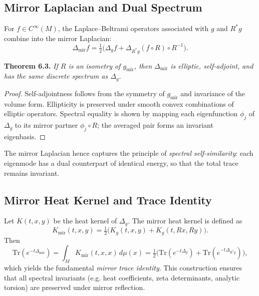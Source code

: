 \subsection{Mirror Laplacian and Dual Spectrum}\relax \hspace{0pt}

For \(f\in C^{\infty}(M)\),
the Laplace–Beltrami operators associated with \(g\) and \(R^{*}g\)
combine into the mirror Laplacian:
\begin{equation}
\Delta_{\mathrm{mir}}f
=\tfrac{1}{2}\big(\Delta_{g}f+\Delta_{R^{*}g}(f\!\circ\!R)\!\circ\!R^{-1}\big).
\end{equation}

\noindent
\textbf{Theorem 6.3.}
\emph{If \(R\) is an isometry of \(g_{\mathrm{mir}}\),
then \(\Delta_{\mathrm{mir}}\) is elliptic, self-adjoint,
and has the same discrete spectrum as \(\Delta_{g}\).}

\begin{proof}
Self-adjointness follows from the symmetry
of \(g_{\mathrm{mir}}\) and invariance of the volume form.
Ellipticity is preserved under smooth convex combinations of elliptic operators.
Spectral equality is shown by mapping each eigenfunction
\(\phi_{j}\) of \(\Delta_{g}\)
to its mirror partner \(\phi_{j}\!\circ\!R\);
the averaged pair forms an invariant eigenbasis.
\end{proof}

The mirror Laplacian hence captures the principle of
\emph{spectral self-similarity}:
each eigenmode has a dual counterpart of identical energy,
so that the total trace remains invariant.

\subsection{Mirror Heat Kernel and Trace Identity}\relax \hspace{0pt}

Let \(K(t,x,y)\) be the heat kernel of \(\Delta_{g}\).
The mirror heat kernel is defined as
\begin{equation}
K_{\mathrm{mir}}(t,x,y)
=\tfrac{1}{2}\big(K_{g}(t,x,y)+K_{g}(t,Rx,Ry)\big).
\end{equation}
Then
\[
\mathrm{Tr}(e^{-t\Delta_{\mathrm{mir}}})
=\int_{M}K_{\mathrm{mir}}(t,x,x)\,d\mu(x)
=\tfrac{1}{2}\big(\mathrm{Tr}(e^{-t\Delta_{g}})
+\mathrm{Tr}(e^{-t\Delta_{R^{*}g}})\big),
\]
which yields the fundamental \emph{mirror trace identity}.
This construction ensures that all spectral invariants
(e.g. heat coefficients, zeta determinants, analytic torsion)
are preserved under mirror reflection.

